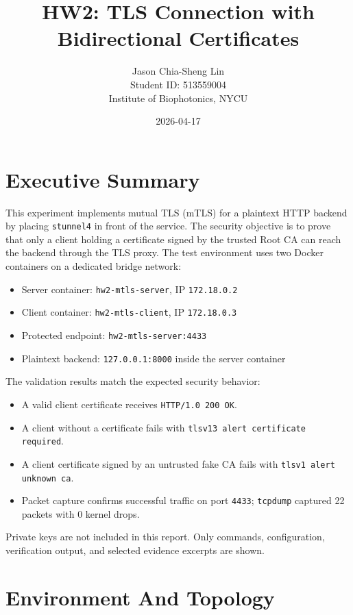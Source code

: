 \documentclass[11pt]{article}
\title{\textbf{HW2: TLS Connection with Bidirectional Certificates}}
\author{
Jason Chia-Sheng Lin\\
Student ID: 513559004\\
Institute of Biophotonics, NYCU
}
\date{2026-04-17}
\begin{document}
\maketitle

\section*{Executive Summary}

This experiment implements mutual TLS (mTLS) for a plaintext HTTP backend by placing \texttt{stunnel4} in front of the service. The security objective is to prove that only a client holding a certificate signed by the trusted Root CA can reach the backend through the TLS proxy. The test environment uses two Docker containers on a dedicated bridge network:

\begin{itemize}
  \item Server container: \texttt{hw2-mtls-server}, IP \texttt{172.18.0.2}
  \item Client container: \texttt{hw2-mtls-client}, IP \texttt{172.18.0.3}
  \item Protected endpoint: \texttt{hw2-mtls-server:4433}
  \item Plaintext backend: \texttt{127.0.0.1:8000} inside the server container
\end{itemize}

The validation results match the expected security behavior:

\begin{itemize}
  \item A valid client certificate receives \texttt{HTTP/1.0 200 OK}.
  \item A client without a certificate fails with \texttt{tlsv13 alert certificate required}.
  \item A client certificate signed by an untrusted fake CA fails with \texttt{tlsv1 alert unknown ca}.
  \item Packet capture confirms successful traffic on port \texttt{4433}; \texttt{tcpdump} captured 22 packets with 0 kernel drops.
\end{itemize}

Private keys are not included in this report. Only commands, configuration, verification output, and selected evidence excerpts are shown.

\section{Environment And Topology}
\end{document}
